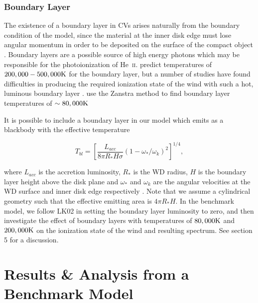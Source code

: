 \documentclass[preprint, a4paper, 11pt]{aastex}
\begin{document}
\subsubsection{Boundary Layer}
The existence of a boundary layer in CVs arises naturally from the boundary condition
of the \cite{shakurasunyaev1973} model, since the material at the inner disk
edge must lose angular momentum in order to be deposited on
the surface of the compact object \cite[see e.g.][]{lyndenbell1974}.
Boundary layers are a possible source of
high energy photons which may be responsible for the photoionization of 
He~\textsc{ii}. 
\cite{pringlesavonije1979} predict temperatures of 
$200,000-500,000{\rm K}$ for the boundary layer,
but a number of studies have found difficulties
in producing the required ionization state of the wind
with such a hot, luminous boundary layer 
\citep[see e.g.][]{maucheraymond1987, drewverbunt1985}.
\cite{hoare1991}
use the Zanstra method to find boundary layer temperatures of
$\sim80,000{\rm K}$


It is possible to include a boundary layer in our model which emits 
as a blackbody with the effective temperature

\begin{equation}
T_{bl} = \left[ \frac{L_{acc}}{8 \pi R_* H \sigma} ( 1 - \omega_*/\omega_k)^2 \right]^{1/4},
\label{bl}
\end{equation}

where $L_{acc}$ is the accretion luminosity, $R_*$ is the WD radius, $H$ is the boundary layer height
above the disk plane
and $\omega_*$ and $\omega_k$ are the angular velocities at the WD surface and inner disk edge respectively
\citep{fkrbook}. Note that we assume a cylindrical geometry such that the effective emitting
area is $4 \pi R_* H$. 
In the benchmark model, we follow LK02 in setting the boundary layer
luminosity to zero, and then investigate the effect
of boundary layers with temperatures of $80,000{\rm K}$ and $200,000{\rm K}$ 
on the ionization state of the wind and resulting
spectrum. See section 5 for a discussion.


%
%

\section{Results \& Analysis from a Benchmark Model}
\end{document}

